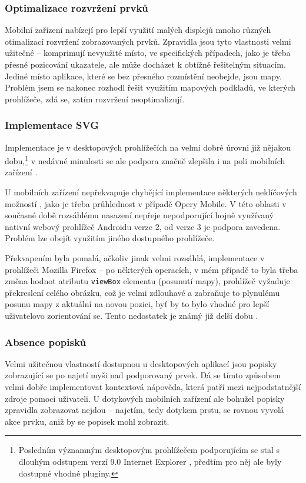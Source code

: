 \subsubsection{Optimalizace rozvržení prvků}
Mobilní zařízení nabízejí pro lepší využití malých displejů mnoho různých otimalizací rozvržení zobrazovaných prvků. Zpravidla jsou tyto vlastnosti velmi užitečné -- komprimují nevyužité místo, ve specifických případech, jako je třeba přesné pozicování ukazatele, ale může docházet k obtížně řešitelným situacím. Jediné místo aplikace, které se bez přesného rozmístění neobejde, jsou mapy. Problém jsem se nakonec rozhodl řešit využitím   mapových podkladů, ve kterých prohlížeče, zdá se, zatím rozvržení neoptimalizují.

\subsubsection{Implementace SVG}
Implementace  je v desktopových prohlížečích na velmi dobré úrovni již nějakou dobu,\footnote{Posledním významným desktopovým prohlížečem podporujícím  se stal s dlouhým odstupem verzí 9.0 Internet Explorer \cite{CanIUse}, předtím pro něj ale byly dostupné vhodné pluginy.} v nedávné minulosti se ale podpora značně zlepšila i na poli mobilních zařízení \cite{CanIUse}.

U mobilních zařízení nepřekvapuje chybějící implementace některých neklíčových možností , jako je třeba průhlednost v případě Opery Mobile. V této oblasti v současné době rozsáhlému nasazení nepřeje  nepodporující hojně využívaný nativní webový prohlížeč Androidu verze 2, od verze 3 je podpora zavedena. Problém lze obejít využitím jiného dostupného prohlížeče.

Překvapením byla pomalá, ačkoliv jinak velmi rozsáhlá, implementace  v prohlížeči Mozilla Firefox -- po některých operacích, v mém případě to byla třeba změna hodnot atributu \texttt{viewBox}  elementu (posunutí mapy), prohlížeč vyžaduje překreslení celého obrázku, což je velmi zdlouhavé a zabraňuje to plynulému posunu mapy z aktuální na novou pozici, byť by to bylo vhodné pro lepší uživatelovo zorientování se. Tento nedostatek je známý již delší dobu \cite{Bugzilla}.

\subsubsection{Absence popisků}
Velmi užitečnou vlastností dostupnou u desktopových aplikací jsou popisky zobrazující se po najetí myši nad podporovaný prvek. Dá se tímto způsobem velmi dobře implementovat kontextová nápověda, která patří mezi nejpodstatnější zdroje pomoci uživateli. U dotykových mobilních zařízení ale bohužel popisky zpravidla zobrazovat nejdou -- najetím, tedy dotykem prstu, se rovnou vyvolá akce prvku, aniž by se popisek mohl zobrazit.

